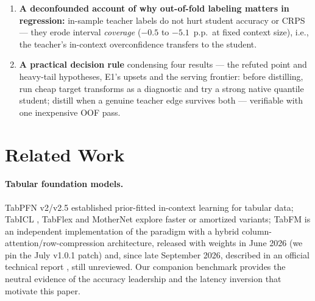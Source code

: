 \documentclass[11pt]{article}
\begin{document}
\begin{enumerate}
    \S\ref{sec:setup} --- and 27$\times$ on year\_prediction), while on
    kin8nm --- a latency case: the teacher is already cheap at the
    student's tier (its relative edge, 44\%, is among the largest)
    --- a single-member teacher
    already matches student latency, and
    side-findings show ensemble reduction is underrated (1 member $\approx$
    8 at 1/7 the latency) while the last context doubling is grossly
    overpriced on 16\,GB GPUs.
  \item \textbf{A deconfounded account of why out-of-fold labeling matters
    in regression:} in-sample teacher labels do not hurt student accuracy
    or CRPS --- they erode interval \emph{coverage} ($-0.5$ to $-5.1$~p.p.\
    at fixed context size), i.e., the teacher's in-context overconfidence
    transfers to the student.
  \item \textbf{A practical decision rule} condensing four results
    --- the refuted point and heavy-tail hypotheses, E1's upsets and
    the serving frontier: before distilling, run cheap target
    transforms as a diagnostic and try a strong native quantile
    student; distill when a
    genuine teacher edge survives both --- verifiable with one inexpensive
    OOF pass.
\end{enumerate}

\section{Related Work}

\paragraph{Tabular foundation models.} TabPFN v2/v2.5
\citep{hollmann2025,priorlabs2025} established prior-fitted in-context
learning for tabular data; TabICL \citep{tabicl2025}, TabFlex
\citep{tabflex2025} and MotherNet \citep{mothernet2023} explore faster or
amortized variants; TabFM \citep{tabfm2026} is an independent implementation
of the paradigm with a hybrid column-attention/row-compression
architecture, released with weights in June 2026 (we pin the July
v1.0.1 patch) and, since late September 2026, described in an official
technical report \citep{kong2026}, still unreviewed.
Our companion benchmark provides the neutral evidence of the accuracy
leadership and the latency inversion that motivate this paper.
\end{document}
